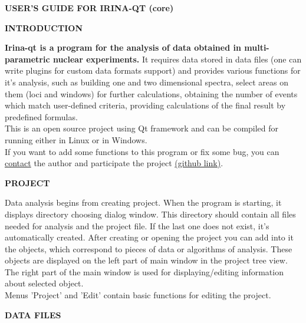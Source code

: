 \documentclass[a4paper]{article}
\begin{document}
\begin{center}{\textbf{\Large USER'S GUIDE FOR IRINA-QT (core)}}\end{center}
%
\hypertarget{intro}{}
{\begin{center}\textbf{INTRODUCTION}\end{center}}
{
\textbf{Irina-qt is a program for the analysis of data obtained in multi-parametric nuclear experiments.} 
It requires data stored in data files (one can write plugins for custom data formats support) and provides various functions for it's analysis, such as building one and two dimensional spectra, select areas on them (loci and windows) for further calculations, obtaining the number of events which match user-defined criteria, providing calculations of the final result by predefined formulas.
\hypertarget{contacts}{\\}
This is an open source project using Qt framework and can be compiled for running either in Linux or in Windows.
\hypertarget{contacts}{\\}
If you want to add some functions to this program or fix some bug, you can 
\href{mailto:alex_kernphysiker@privatdemail.net}{contact} 
the author and participate the project
\href{https://github.com/alexkernphysiker/Irina-qt}{(github link)}.
}
%
\hypertarget{project}{\\}
\begin{center}\textbf{PROJECT}\end{center}
{
Data analysis begins from creating project. When the program is starting, it displays directory choosing dialog window. 
This directory should contain all files needed for analysis and the project file. 
If the last one does not exist, it's automatically created. After creating or opening the project you can add into it the objects, which correspond to pieces of data or algorithms of analysis. 
These objects are displayed on the left part of main window in the project tree view. 
The right part of the main window is used for displaying/editing information about selected object.\\
Menus 'Project' and 'Edit' contain basic functions for editing the project.
}
%
\hypertarget{datafile}{\\}
\begin{center}\textbf{DATA FILES}\end{center}
\end{document}
